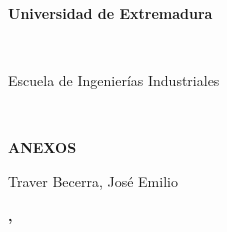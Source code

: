 \begin{titlepage}
\begin{center}
\begin{LARGE}
\textbf{Universidad de Extremadura} \\
\end{LARGE}
\ \\
\begin{Large}
Escuela de Ingenierías Industriales\\
\end{Large}
\ \\
\begin{large}
\Asignatura
\end{large}
\end{center}
\vspace{6cm}
\begin{flushright}
\begin{huge}
\textbf{ANEXOS}
\end{huge}
\end{flushright}
\vspace{10cm}
\begin{center}
Traver Becerra, José Emilio \\
\Degree
\end{center}
	\begin{center}
		\textbf{\myLocation, \myTime}
	\end{center}
\end{titlepage}

